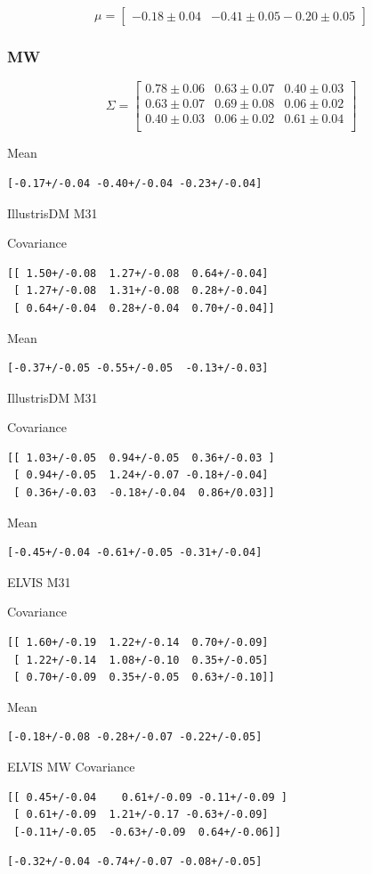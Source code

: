\documentclass[a4paper,fleqn,usenatbib]{mnras}
\begin{document}
\[
\mu= 
\begin{bmatrix}
-0.18\pm 0.04 & -0.41\pm 0.05  -0.20\pm 0.05
\end{bmatrix}
\]

\subsubsection{MW}

\[
\Sigma= 
\begin{bmatrix}
 0.78\pm 0.06 & 0.63 \pm 0.07  & 0.40 \pm 0.03\\
  0.63\pm 0.07 & 0.69 \pm 0.08 &  0.06 \pm 0.02\\
  0.40\pm 0.03 & 0.06 \pm 0.02 &  0.61\pm 0.04\\
\end{bmatrix}
\]


Mean
\begin{verbatim}
[-0.17+/-0.04 -0.40+/-0.04 -0.23+/-0.04]
\end{verbatim}



IllustrisDM M31

Covariance
\begin{verbatim}
[[ 1.50+/-0.08  1.27+/-0.08  0.64+/-0.04]
 [ 1.27+/-0.08  1.31+/-0.08  0.28+/-0.04]
 [ 0.64+/-0.04  0.28+/-0.04  0.70+/-0.04]]
\end{verbatim}

Mean
\begin{verbatim}
[-0.37+/-0.05 -0.55+/-0.05  -0.13+/-0.03]
\end{verbatim}

IllustrisDM M31

Covariance
\begin{verbatim}
[[ 1.03+/-0.05  0.94+/-0.05  0.36+/-0.03 ]
 [ 0.94+/-0.05  1.24+/-0.07 -0.18+/-0.04]
 [ 0.36+/-0.03  -0.18+/-0.04  0.86+/0.03]]
\end{verbatim}

Mean
\begin{verbatim}
[-0.45+/-0.04 -0.61+/-0.05 -0.31+/-0.04]
\end{verbatim}

ELVIS M31

Covariance
\begin{verbatim}
[[ 1.60+/-0.19  1.22+/-0.14  0.70+/-0.09]
 [ 1.22+/-0.14  1.08+/-0.10  0.35+/-0.05]
 [ 0.70+/-0.09  0.35+/-0.05  0.63+/-0.10]]
\end{verbatim}

Mean
\begin{verbatim}
[-0.18+/-0.08 -0.28+/-0.07 -0.22+/-0.05]
\end{verbatim}

ELVIS MW
Covariance
\begin{verbatim}
[[ 0.45+/-0.04    0.61+/-0.09 -0.11+/-0.09 ]
 [ 0.61+/-0.09  1.21+/-0.17 -0.63+/-0.09]
 [-0.11+/-0.05  -0.63+/-0.09  0.64+/-0.06]]
\end{verbatim}

\begin{verbatim}
[-0.32+/-0.04 -0.74+/-0.07 -0.08+/-0.05]
\end{verbatim}
\end{document}
